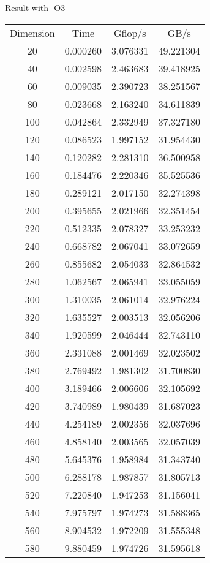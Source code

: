 \documentclass[titlepage]{article}
\begin{document}
\newpage
Result with -O3

\begin{tabular} {c c c c}
Dimension   &     Time   &Gflop/s  &    GB/s   \\
        20  &  0.000260  &3.076331 &49.221304 \\
        40  &  0.002598  &2.463683 &39.418925 \\
        60  &  0.009035  &2.390723 &38.251567 \\
        80  &  0.023668  &2.163240 &34.611839 \\
        100 &   0.042864 & 2.332949& 37.327180 \\
        120 &   0.086523 & 1.997152& 31.954430 \\
        140 &   0.120282 & 2.281310& 36.500958 \\
        160 &   0.184476 & 2.220346& 35.525536 \\
        180 &   0.289121 & 2.017150& 32.274398 \\
        200 &   0.395655 & 2.021966& 32.351454 \\
        220 &   0.512335 & 2.078327& 33.253232 \\
        240 &   0.668782 & 2.067041& 33.072659 \\
        260 &   0.855682 & 2.054033& 32.864532 \\
        280 &   1.062567 & 2.065941& 33.055059 \\
        300 &   1.310035 & 2.061014& 32.976224 \\
        320 &   1.635527 & 2.003513& 32.056206 \\
        340 &   1.920599 & 2.046444& 32.743110 \\
        360 &   2.331088 & 2.001469& 32.023502 \\
        380 &   2.769492 & 1.981302& 31.700830 \\
        400 &   3.189466 & 2.006606& 32.105692 \\
        420 &   3.740989 & 1.980439& 31.687023 \\
        440 &   4.254189 & 2.002356& 32.037696 \\
        460 &   4.858140 & 2.003565& 32.057039 \\
        480 &   5.645376 & 1.958984& 31.343740 \\
        500 &   6.288178 & 1.987857& 31.805713 \\
        520 &   7.220840 & 1.947253& 31.156041 \\
        540 &   7.975797 & 1.974273& 31.588365 \\
        560 &   8.904532 & 1.972209& 31.555348 \\
        580 &   9.880459 & 1.974726& 31.595618
\end{tabular}
\end{document}
